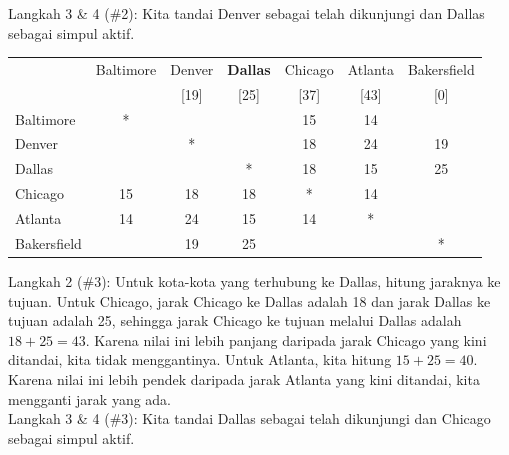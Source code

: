\begin{example}{}
\noindent Langkah 3 \& 4 (\#2):  Kita tandai Denver sebagai telah dikunjungi dan Dallas sebagai simpul aktif.
 \begin{center}
 \begin{tabular}{|l|c|c|c|c|c|c|}
 \hline
 & Baltimore & \cellcolor{yellow}Denver & \textbf{Dallas} & Chicago & Atlanta & \cellcolor{yellow}Bakersfield\\
 && \cellcolor{yellow}[19]&[25]&[37]&[43]&\cellcolor{yellow}[0]\\
 \hline
 Baltimore & * & \cellcolor{yellow}&&15&14&\cellcolor{yellow}\\
 \hline
  \cellcolor{yellow}Denver & \cellcolor{yellow}& \cellcolor{yellow}*& \cellcolor{yellow}& \cellcolor{yellow}18& \cellcolor{yellow}24&\cellcolor{yellow}19\\
 \hline
Dallas&& \cellcolor{yellow}&*&18&15&\cellcolor{yellow}25\\
 \hline
 Chicago &15& \cellcolor{yellow}18&18&*&14&\cellcolor{yellow}\\
 \hline
 Atlanta & 14 &  \cellcolor{yellow}24&15&14&*&\cellcolor{yellow}\\
 \hline
 \cellcolor{yellow}Bakersfield &\cellcolor{yellow}&\cellcolor{yellow}19&\cellcolor{yellow}25&\cellcolor{yellow}&\cellcolor{yellow}&\cellcolor{yellow}*\\
 \hline
 \end{tabular}
 \end{center}

\noindent Langkah 2 (\#3):  Untuk kota-kota yang terhubung ke Dallas, hitung jaraknya ke tujuan.  Untuk Chicago, jarak Chicago ke Dallas adalah 18 dan jarak Dallas ke tujuan adalah 25, sehingga jarak Chicago ke tujuan melalui Dallas adalah $18+25 = 43$.  Karena nilai ini lebih panjang daripada jarak Chicago yang kini ditandai, kita tidak menggantinya.  Untuk Atlanta, kita hitung $15+25 = 40$.  Karena nilai ini lebih pendek daripada jarak Atlanta yang kini ditandai, kita mengganti jarak yang ada.\\

\noindent Langkah 3 \& 4 (\#3):  Kita tandai Dallas sebagai telah dikunjungi dan Chicago sebagai simpul aktif.


\end{example}
